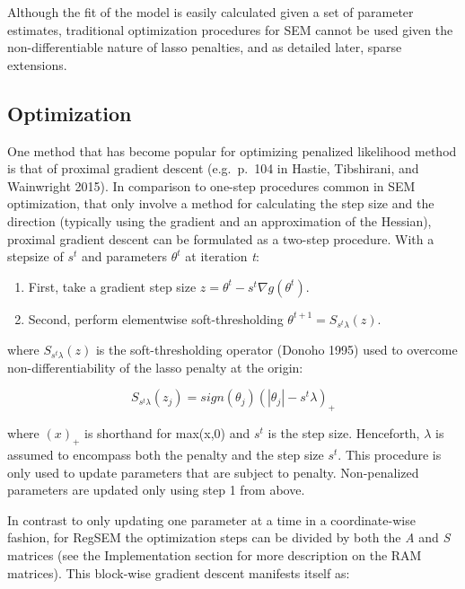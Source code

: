 Although the fit of the model is easily calculated given a set of
parameter estimates, traditional optimization procedures for SEM cannot
be used given the non-differentiable nature of lasso penalties, and as
detailed later, sparse extensions.

\subsection{Optimization}\label{optimization}

One method that has become popular for optimizing penalized likelihood
method is that of proximal gradient descent (e.g.~p.~104 in Hastie,
Tibshirani, and Wainwright 2015). In comparison to one-step procedures
common in SEM optimization, that only involve a method for calculating
the step size and the direction (typically using the gradient and an
approximation of the Hessian), proximal gradient descent can be
formulated as a two-step procedure. With a stepsize of \(s^{t}\) and
parameters \(\theta^{t}\) at iteration \textit{t}:

\begin{enumerate}
    \item First, take a gradient step size $z = \theta^{t} - s^{t} \nabla g(\theta^{t})$.
    \item Second, perform elementwise soft-thresholding $\theta^{t+1} = S_{s^{t} \lambda}(z)$.
\end{enumerate}

where \(S_{s^{t} \lambda}(z)\) is the soft-thresholding operator (Donoho
1995) used to overcome non-differentiability of the lasso penalty at the
origin:

\begin{equation}
S_{s^{t} \lambda}(z_{j}) = sign(\theta_{j})(|\theta_{j}|-s^{t} \lambda)_{+}
\end{equation}

where \((x)_{+}\) is shorthand for max(x,0) and \(s^{t}\) is the step
size. Henceforth, \(\lambda\) is assumed to encompass both the penalty
and the step size \(s^{t}\). This procedure is only used to update
parameters that are subject to penalty. Non-penalized parameters are
updated only using step 1 from above.

In contrast to only updating one parameter at a time in a
coordinate-wise fashion, for RegSEM the optimization steps can be
divided by both the \textit{A} and \textit{S} matrices (see the
Implementation section for more description on the RAM matrices). This
block-wise gradient descent manifests itself as:


